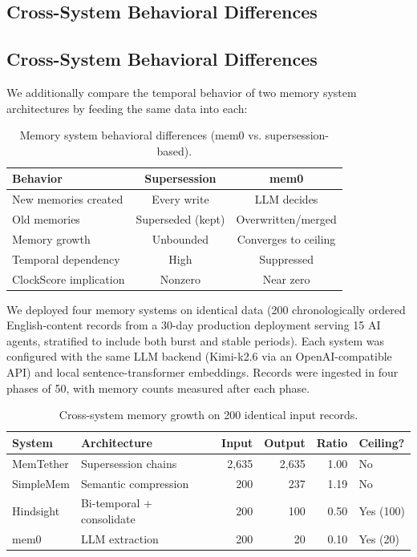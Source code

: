 \documentclass[sigconf,nonacm]{acmart}
\begin{document}
\subsection{Cross-System Behavioral Differences}

\subsection{Cross-System Behavioral Differences}

We additionally compare the temporal behavior of two memory system architectures by feeding the same data into each:

\begin{table}[h]
\centering
\caption{Memory system behavioral differences (mem0 vs. supersession-based).}
\begin{tabular}{lcc}
\toprule
Behavior & Supersession & mem0 \\
\midrule
New memories created & Every write & LLM decides \\
Old memories & Superseded (kept) & Overwritten/merged \\
Memory growth & Unbounded & Converges to ceiling \\
Temporal dependency & High & Suppressed \\
ClockScore implication & Nonzero & Near zero \\
\bottomrule
\end{tabular}
\end{table}

We deployed four memory systems on identical data (200 chronologically ordered English-content records from a 30-day production deployment serving 15 AI agents, stratified to include both burst and stable periods). Each system was configured with the same LLM backend (Kimi-k2.6 via an OpenAI-compatible API) and local sentence-transformer embeddings. Records were ingested in four phases of 50, with memory counts measured after each phase.

\begin{table}[h]
\centering
\caption{Cross-system memory growth on 200 identical input records.}
\label{tab:crosssystem}
\begin{tabular}{llrrrl}
\toprule
System & Architecture & Input & Output & Ratio & Ceiling? \\
\midrule
MemTether & Supersession chains & 2{,}635 & 2{,}635 & 1.00 & No \\
SimpleMem & Semantic compression & 200 & 237 & 1.19 & No \\
Hindsight & Bi-temporal + consolidate & 200 & 100 & 0.50 & Yes (100) \\
mem0 & LLM extraction & 200 & 20 & 0.10 & Yes (20) \\
\bottomrule
\end{tabular}
\end{table}
\end{document}
